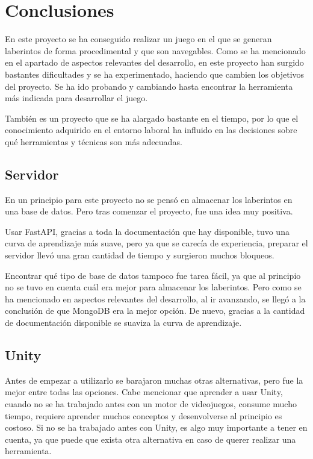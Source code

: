

\section{Conclusiones}
En este proyecto se ha conseguido realizar un juego en el que se generan laberintos de forma procedimental y que son navegables. 
Como se ha mencionado en el apartado de aspectos relevantes del desarrollo, en este proyecto han surgido bastantes dificultades y se ha experimentado, haciendo que cambien los objetivos del proyecto. Se ha ido probando y cambiando hasta encontrar la herramienta más indicada para desarrollar el juego. 

También es un proyecto que se ha alargado bastante en el tiempo, por lo que el conocimiento adquirido en el entorno laboral ha influido en las decisiones sobre qué herramientas y técnicas son más adecuadas.

\subsection{Servidor}
En un principio para este proyecto no se pensó en almacenar los laberintos en una base de datos. Pero tras comenzar el proyecto, fue una idea muy positiva.

Usar FastAPI, gracias a toda la documentación que hay disponible, tuvo una curva de aprendizaje más suave, pero ya que se carecía de experiencia, preparar el servidor llevó una gran cantidad de tiempo y surgieron muchos bloqueos. 

Encontrar qué tipo de base de datos tampoco fue tarea fácil, ya que al principio no se tuvo en cuenta cuál era mejor para almacenar los laberintos. Pero como se ha mencionado en aspectos relevantes del desarrollo, al ir avanzando, se llegó a la conclusión de que MongoDB era la mejor opción. De nuevo, gracias a la cantidad de documentación disponible se suaviza la curva de aprendizaje.
\subsection{Unity}

Antes de empezar a utilizarlo se barajaron muchas otras alternativas, pero fue la mejor entre todas las opciones. Cabe mencionar que aprender a usar Unity, cuando no se ha trabajado antes con un motor de videojuegos, consume mucho tiempo, requiere aprender muchos conceptos y desenvolverse al principio es costoso.
Si no se ha trabajado antes con Unity, es algo muy importante a tener en cuenta, ya que puede que exista otra alternativa en caso de querer realizar una herramienta.

